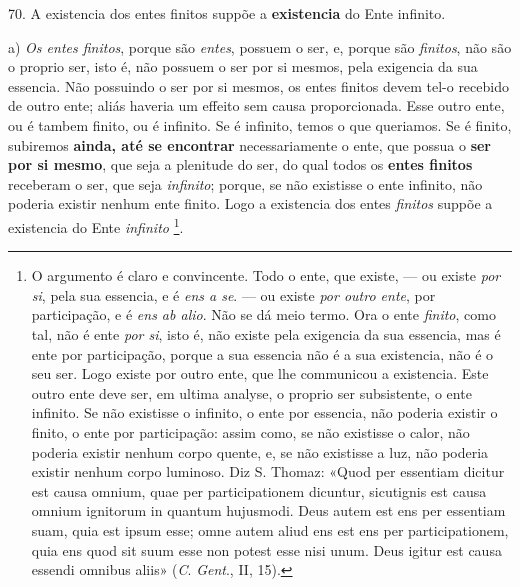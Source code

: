 70. A existencia dos entes finitos suppõe a \textbf{existencia} do Ente infinito.

a) \emph{Os entes finitos}, porque são \emph{entes}, possuem o ser, e, porque são \emph{finitos}, não são o proprio ser, isto é, não possuem o ser por si mesmos, pela exigencia da sua essencia. Não possuindo o ser por si mesmos, os entes finitos devem tel-o recebido de outro ente; aliás haveria um effeito sem causa proporcionada. Esse outro ente, ou é tambem finito, ou é infinito. Se é infinito, temos o que queriamos. Se é finito, subiremos \textbf{ainda, até se encontrar} necessariamente o ente, que possua o \textbf{ser} \textbf{por si mesmo}, que seja a plenitude do ser, do qual todos os \textbf{entes finitos} receberam o ser, que seja \emph{infinito}; porque, se não existisse o ente infinito, não poderia existir nenhum ente finito. Logo a existencia dos entes \emph{finitos} suppõe a existencia do Ente \emph{infinito} \footnote{O argumento é claro e convincente. Todo o ente, que existe, --- ou existe \emph{por si}, pela sua essencia, e é \emph{ens a se}. --- ou existe \emph{por outro ente}, por participação, e é \emph{ens ab alio}. Não se dá meio termo. Ora o ente \emph{finito}, como tal, não é ente \emph{por si}, isto é, não existe pela exigencia da sua essencia, mas é ente por participação, porque a sua essencia não é a sua existencia, não é o seu ser. Logo existe por outro ente, que lhe communicou a existencia. Este outro ente deve ser, em ultima analyse, o proprio ser subsistente, o ente infinito. Se não existisse o infinito, o ente por essencia, não poderia existir o finito, o ente por participação: assim como, se não existisse o calor, não poderia existir nenhum corpo quente, e, se não existisse a luz, não poderia existir nenhum corpo luminoso. Diz S. Thomaz: «Quod per essentiam dicitur est causa omnium, quae per participationem dicuntur, sicutignis est causa omnium ignitorum in quantum hujusmodi. Deus autem est ens per essentiam suam, quia est ipsum esse; omne autem aliud ens est ens per participationem, quia ens quod sit suum esse non potest esse nisi unum. Deus igitur est causa essendi omnibus aliis» (\emph{C}. \emph{Gent}., II, 15).}.
